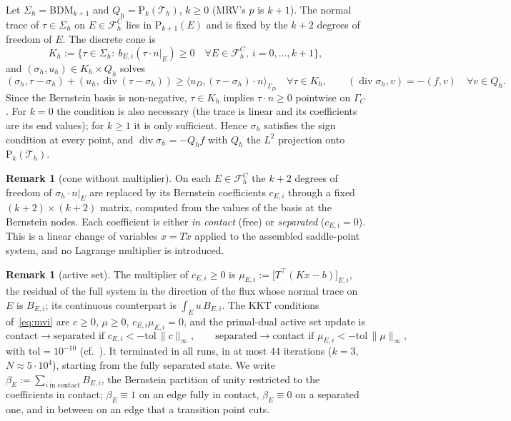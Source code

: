 \documentclass[11pt,a4paper]{article}
\theoremstyle{definition}
\newtheorem{remark}[definition]{Remark}
\newcommand{\BDM}{\mathrm{BDM}}
\newcommand{\Pk}[1]{\mathrm{P}_{#1}}
\newcommand{\dive}{\operatorname{div}}
\newcommand{\Th}{\mathcal{T}_h}
\newcommand{\FC}{\mathcal{F}^{C}_h}
\begin{document}
Let $\Sigma_h=\BDM_{k+1}$ and $Q_h=\Pk{k}(\Th)$, $k\ge0$ (MRV's $p$ is $k+1$). The normal trace of
$\tau\in\Sigma_h$ on $E\in\FC$ lies in $\Pk{k+1}(E)$ and is fixed by the $k+2$ degrees of freedom
of $E$. The discrete cone is
\[
  K_h:=\{\tau\in\Sigma_h:\ b_{E,i}(\tau\cdot n|_E)\ge0\quad\forall E\in\FC,\ i=0,\dots,k+1\},
\]
and $(\sigma_h,u_h)\in K_h\times Q_h$ solves
\begin{equation}\label{eq:mvi}
  (\sigma_h,\tau-\sigma_h)+(u_h,\dive(\tau-\sigma_h))\ge\langle u_D,(\tau-\sigma_h)\cdot n\rangle_{\Gamma_D}
  \quad\forall\tau\in K_h,\qquad (\dive\sigma_h,v)=-(f,v)\quad\forall v\in Q_h .
\end{equation}
Since the Bernstein basis is non-negative, $\tau\in K_h$ implies $\tau\cdot n\ge0$ pointwise on
$\Gamma_C$. For $k=0$ the condition is also necessary (the trace is linear and its coefficients are
its end values); for $k\ge1$ it is only sufficient. Hence $\sigma_h$ satisfies the sign condition at
every point, and $\dive\sigma_h=-Q_hf$ with $Q_h$ the $L^2$ projection onto $\Pk{k}(\Th)$.

\begin{remark}[cone without multiplier]
On each $E\in\FC$ the $k+2$ degrees of freedom of $\sigma_h\cdot n|_E$ are replaced by its
Bernstein coefficients $c_{E,i}$ through a fixed $(k+2)\times(k+2)$ matrix, computed from the
values of the basis at the Bernstein nodes. Each coefficient is either \emph{in contact} (free)
or \emph{separated} ($c_{E,i}=0$). This is a linear change of variables $x=T\tilde x$ applied to the
assembled saddle-point system, and no Lagrange multiplier is introduced.
\end{remark}

\begin{remark}[active set]\label{rem:pdas}
The multiplier of $c_{E,i}\ge0$ is $\mu_{E,i}:=\bigl[T^\top(Kx-b)\bigr]_{E,i}$, the residual of the
full system in the direction of the flux whose normal trace on $E$ is $B_{E,i}$; its continuous
counterpart is $\int_E u\,B_{E,i}$. The KKT conditions of~\eqref{eq:mvi} are $c\ge0$, $\mu\ge0$,
$c_{E,i}\mu_{E,i}=0$, and the primal-dual active set update is
\[
  \text{contact}\to\text{separated if } c_{E,i}<-\mathrm{tol}\,\|c\|_\infty,\qquad
  \text{separated}\to\text{contact if } \mu_{E,i}<-\mathrm{tol}\,\|\mu\|_\infty,
\]
with $\mathrm{tol}=10^{-10}$ (cf.~\cite{hik}). It terminated in all runs, in at most $44$ iterations ($k=3$,
$N\approx5\cdot10^4$), starting from the fully separated state. We write
$\beta_E:=\sum_{i\ \text{in contact}}B_{E,i}$, the Bernstein partition of unity restricted to the
coefficients in contact; $\beta_E\equiv1$ on an edge fully in contact, $\beta_E\equiv0$ on a
separated one, and in between on an edge that a transition point cuts.
\end{remark}
\end{document}
